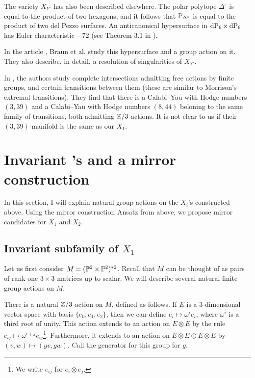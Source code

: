 \begin{remark}
The variety $X_{Y'}$ has also been described elsewhere. The polar polytope $\Delta^{\circ}$ is equal to the product of two hexagons, and it follows that $\P_{\Delta^\circ}$ is equal to the product of two del Pezzo surfaces. An anticanonical hypersurface in $\dP6 \times \dP6$ has Euler characteristic $-72$ (see Theorem 3.1 in \cite{bestiary_hubsch}).

In the article \cite{braun_smallhodgenumbers}, Braun et al. study this hypersurface and a group action on it. They also describe, in detail, a resolution of singularities of $X_{Y'}$.
\end{remark}

\begin{remark}
In \cite{candelas_newcy}, the authors study \CY complete intersections admitting free actions by finite groups, and certain transitions between them (these are similar to Morrison's extremal transitions). They find that there is a Calabi--Yau with Hodge numbers $(3,39)$ and a Calabi--Yau with Hodge numbers $(8,44)$ beloning to the same family of transitions, both admitting $\Z/3$-actions. It is not clear to us if their $(3,39)$-manifold is the same as our $X_1$.
\end{remark}

\section{Invariant \CY's and a mirror construction}

In this section, I will explain natural group actions on the $X_i$'s constructed above. Using the mirror construction Ansatz from above, we propose mirror candidates for $X_1$ and $X_2$.

\subsection{Invariant subfamily of $X_1$} 

Let us first consider $M=(\P^2 \times \P^2)^{\ast 2}$. Recall that $M$ can be thought of as pairs of rank one $3 \times 3$ matrices up to scalar. We will describe several natural finite group actions on $M$.

There is a natural $\Z/3$-action on $M$, defined as follows. If $E$ is a $3$-dimensional vector space with basis $\{e_0,e_1,e_2\}$, then we can define $e_i \mapsto \omega^i e_i$, where $\omega^i$ is a third root of unity. This action extends to an action on $E \otimes E$ by the rule $e_{ij} \mapsto \omega^{i+j} e_{ij}$\footnote{We write $e_{ij}$ for $e_i \otimes e_j$.}. Furthermore, it extends to an action on $E \otimes E \oplus E \otimes E$ by $(v,w) \mapsto (gv,gw)$. Call the generator for this group for $g$. 

